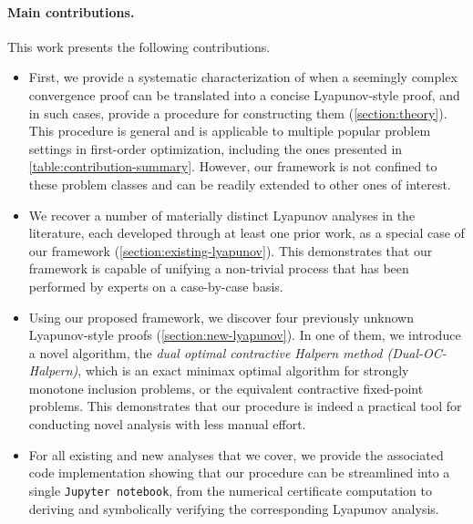 \documentclass{article}
\theoremstyle{definition}
\theoremstyle{plain}
\begin{document}
\paragraph{Main contributions.}
This work presents the following contributions.
\begin{itemize}
    \item First, we provide a systematic characterization of when a seemingly complex convergence proof can be translated into a concise Lyapunov-style proof, and in such cases, provide a procedure for constructing them (\cref{section:theory}).
    This procedure is general and is applicable to multiple popular problem settings in first-order optimization, including the ones presented in \cref{table:contribution-summary}.
    However, our framework is not confined to these problem classes and can be readily extended to other ones of interest.
    
    \item We recover a number of materially distinct Lyapunov analyses in the literature, each developed through at least one prior work, as a special case of our framework (\cref{section:existing-lyapunov}).
    This demonstrates that our framework is capable of unifying a non-trivial process that has been performed by experts on a case-by-case basis.

    \item Using our proposed framework, we discover four previously unknown Lyapunov-style proofs (\cref{section:new-lyapunov}).
    In one of them, we introduce a novel algorithm, the \emph{dual optimal contractive Halpern method (Dual-OC-Halpern)}, which is an exact minimax optimal algorithm for strongly monotone inclusion problems, or the equivalent contractive fixed-point problems.
    This demonstrates that our procedure is indeed a practical tool for conducting novel analysis with less manual effort.

    \item For all existing and new analyses that we cover, we provide the associated code implementation showing that our procedure can be streamlined into a single \texttt{Jupyter notebook}, from the numerical certificate computation to deriving and symbolically verifying the corresponding Lyapunov analysis.
\end{itemize}
\end{document}
